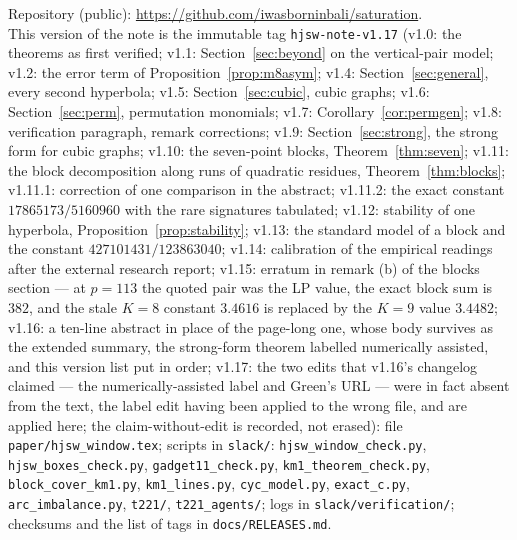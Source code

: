 \documentclass[11pt]{article}
\theoremstyle{remark}
\begin{document}
{\sloppy Repository (public): \url{https://github.com/iwasborninbali/saturation}.\\
This version of the note is the immutable tag \texttt{hjsw-note-v1.17} (v1.0: the theorems as first verified; v1.1: Section~\ref{sec:beyond} on the vertical-pair model; v1.2: the error term of Proposition~\ref{prop:m8asym}; v1.4: Section~\ref{sec:general}, every second hyperbola; v1.5: Section~\ref{sec:cubic}, cubic graphs; v1.6: Section~\ref{sec:perm}, permutation monomials; v1.7: Corollary~\ref{cor:permgen}; v1.8: verification paragraph, remark corrections; v1.9: Section~\ref{sec:strong}, the strong form for cubic graphs; v1.10: the seven-point blocks, Theorem~\ref{thm:seven}; v1.11: the block decomposition along runs of quadratic residues, Theorem~\ref{thm:blocks}; v1.11.1: correction of one comparison in the abstract; v1.11.2: the exact constant $17865173/5160960$ with the rare signatures tabulated; v1.12: stability of one hyperbola, Proposition~\ref{prop:stability}; v1.13: the standard model of a block and the constant $427101431/123863040$; v1.14: calibration of the empirical readings after the external research report; v1.15: erratum in remark (b) of the blocks section --- at $p=113$ the quoted pair was the LP value, the exact block sum is $382$, and the stale $K=8$ constant $3.4616$ is replaced by the $K=9$ value $3.4482$; v1.16: a ten-line abstract in place of the page-long one, whose body survives as the extended summary, the strong-form theorem labelled numerically assisted, and this version list put in order; v1.17: the two edits that v1.16's changelog claimed --- the numerically-assisted label and Green's URL --- were in fact absent from the text, the label edit having been applied to the wrong file, and are applied here; the claim-without-edit is recorded, not erased): file \texttt{paper/hjsw\_window.tex}; scripts in
\texttt{slack/}: \texttt{hjsw\_window\_check.py}, \texttt{hjsw\_boxes\_check.py}, \texttt{gadget11\_\allowbreak check.py},
\texttt{km1\_\allowbreak theorem\_\allowbreak check.py}, \texttt{block\_cover\_km1.py}, \texttt{km1\_lines.py}, \texttt{cyc\_model.py},
\texttt{exact\_c.py}, \texttt{arc\_imbalance.py}, \texttt{t221/}, \texttt{t221\_agents/}; logs in \texttt{slack/verification/};
checksums and the list of tags in \texttt{docs/RELEASES.md}.\par}
\end{document}
